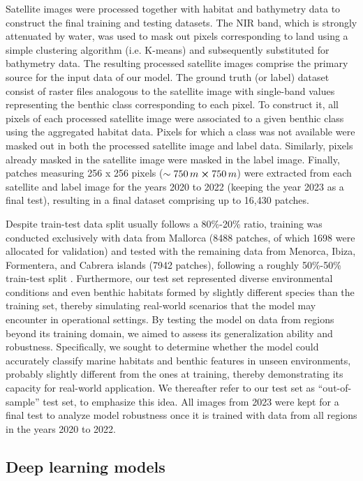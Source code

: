 Satellite images were processed together with habitat and bathymetry data to
construct the final training and testing datasets. The NIR band, which is
strongly attenuated by water, was used to mask out pixels corresponding to land
using a simple clustering algorithm (i.e. K-means) and subsequently substituted
for bathymetry data. The resulting processed
satellite images comprise the primary source for the input data of our model.
The ground truth (or label) dataset consist of raster files analogous to the
satellite image with single-band values representing the benthic class
corresponding to each pixel. To construct it, all pixels of each processed
satellite image were associated to a given benthic class using the aggregated
habitat data. Pixels for which a class was not available were masked out in
both the processed satellite image and label data. Similarly, pixels already
masked in the satellite image were masked in the label image. Finally, patches
measuring 256 x 256 pixels ($\sim 750\,m \cross 750\,m$) were extracted from
each satellite and label image for the years 2020 to 2022 (keeping the year
2023 as a final test), resulting in a final dataset comprising up to
16,430 patches.

Despite train-test data split usually follows a 80\%-20\% ratio, training was
conducted exclusively with data from Mallorca (8488
patches, of which 1698 were allocated for validation) and tested with the
remaining data from Menorca, Ibiza, Formentera, and Cabrera islands (7942
patches), following a roughly 50\%-50\% train-test split . Furthermore, our
test set represented diverse environmental conditions and even benthic habitats
formed by slightly different species than the training set, thereby simulating
real-world scenarios that the model may encounter in operational settings. By
testing the model on data from regions beyond its training domain, we aimed to
assess its generalization ability and robustness. Specifically, we sought to
determine whether the model could accurately classify marine habitats and
benthic features in unseen environments, probably slightly different from the
ones at training, thereby demonstrating its capacity for real-world
application. We thereafter refer to our test set as ``out-of-sample'' test set,
to emphasize this idea. All images from 2023 were kept for a final test to
analyze model robustness once it is trained with data from all regions in the
years 2020 to 2022.

\subsection{Deep learning models}

